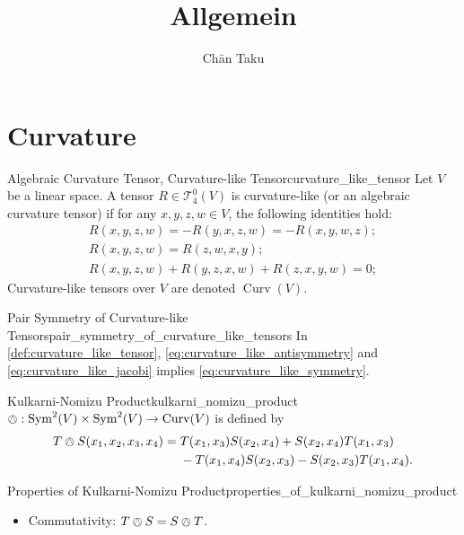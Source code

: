 \documentclass{article}
\title{Allgemein}
\author{Ch\=an Taku}
\begin{document}
\maketitle

\section{Curvature}

\begin{definition}{Algebraic Curvature Tensor, Curvature-like Tensor}{curvature_like_tensor}
    Let $V$ be a linear space. A tensor $R\in \mathscr{T}^0_4(V)$ is curvature-like (or an algebraic curvature tensor) if for any $x,y,z,w\in V$,
    the following identities hold:
    \begin{gather}
        \label{eq:curvature_like_antisymmetry} R(x, y, z, w) = -R(y, x, z, w) = -R(x, y, w, z); \\
        \label{eq:curvature_like_symmetry} R(x, y, z, w) = R(z, w, x, y); \\
        \label{eq:curvature_like_jacobi} R(x, y, z, w) + R(y, z, x, w) + R(z, x, y, w) = 0;
    \end{gather}
    Curvature-like tensors over $V$ are denoted $\operatorname{Curv}(V)$.
\end{definition}

\begin{proposition}{Pair Symmetry of Curvature-like Tensors}{pair_symmetry_of_curvature_like_tensors}
    In \cref{def:curvature_like_tensor},
    \cref{eq:curvature_like_antisymmetry} and \cref{eq:curvature_like_jacobi} implies \cref{eq:curvature_like_symmetry}.
\end{proposition}

\begin{definition}{Kulkarni-Nomizu Product}{kulkarni_nomizu_product}
    $\owedge: \operatorname{Sym}^2(V) \times \operatorname{Sym}^2(V) \rightarrow \operatorname{Curv}(V)$ is defined by 
    \begin{align*}
        T\owedge S(x_1,x_2,x_3,x_4) &= T(x_1,x_3)S(x_2,x_4) + S(x_2,x_4)T(x_1,x_3) \\
        &{\phantom{{}={}}} - T(x_1,x_4)S(x_2,x_3) - S(x_2,x_3)T(x_1,x_4).
    \end{align*}
\end{definition}

\begin{proposition}{Properties of Kulkarni-Nomizu Product}{properties_of_kulkarni_nomizu_product}
    \begin{itemize}
        \item Commutativity: $T\owedge S = S\owedge T$.
    \end{itemize}
\end{proposition}
\end{document}
